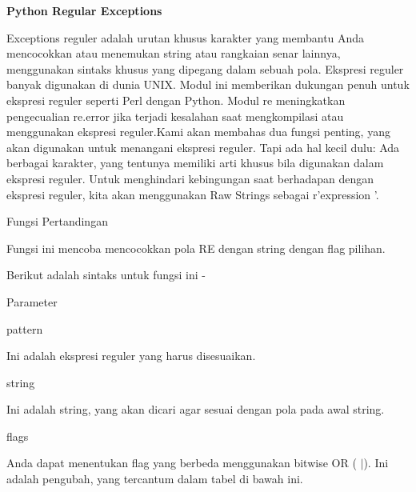 \sloppy
\begin{center}{\fontsize{16pt}{16pt}\selectfont \textbf{Python Regular Exceptions} \\}\end{center} \par
Exceptions reguler adalah urutan khusus karakter yang membantu Anda mencocokkan atau menemukan string atau rangkaian senar lainnya, menggunakan sintaks khusus yang dipegang dalam sebuah pola. Ekspresi reguler banyak digunakan di dunia UNIX. Modul ini memberikan dukungan penuh untuk ekspresi reguler seperti Perl dengan Python. Modul re meningkatkan pengecualian re.error jika terjadi kesalahan saat mengkompilasi atau menggunakan ekspresi reguler.Kami akan membahas dua fungsi penting, yang akan digunakan untuk menangani ekspresi reguler. Tapi ada hal kecil dulu: Ada berbagai karakter, yang tentunya memiliki arti khusus bila digunakan dalam ekspresi reguler. Untuk menghindari kebingungan saat berhadapan dengan ekspresi reguler, kita akan menggunakan Raw Strings sebagai r'expression '. \par
\vspace{14pt}
\noindent 
Fungsi Pertandingan \par
\noindent 
Fungsi ini mencoba mencocokkan pola RE dengan string dengan flag pilihan. \par
\vspace{12pt}
\noindent 
Berikut adalah sintaks untuk fungsi ini - \par
\noindent 
  \par
\noindent 
Parameter \hspace*{0.5in}  \par
\noindent 
pattern \hspace*{0.5in}  \par
\noindent 
Ini adalah ekspresi reguler yang harus disesuaikan. \par
\vspace{12pt}
\noindent 
string \hspace*{0.5in}  \par
\noindent 
Ini adalah string, yang akan dicari agar sesuai dengan pola pada awal string. \par
\vspace{12pt}
\noindent 
flags \hspace*{0.5in}  \par
\noindent 
Anda dapat menentukan flag yang berbeda menggunakan bitwise OR ( $  \vert  $). Ini adalah pengubah, yang tercantum dalam tabel di bawah ini. \par
